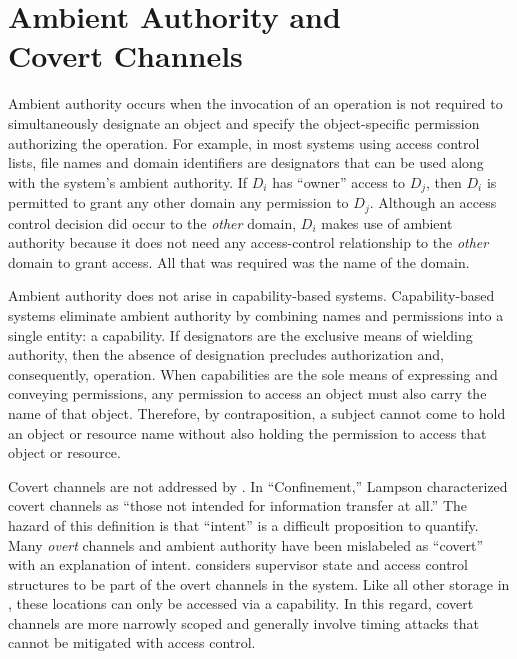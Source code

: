 \section[Ambient Authority and Covert Channels]{Ambient Authority and \\ Covert Channels}
\label{sect:constructor:ambientAuthority}

Ambient authority occurs when the invocation of an operation is not required to simultaneously designate an object and specify the object-specific permission authorizing the operation.
For example, in most systems using access control lists, file names and domain identifiers are designators that can be used along with the system's ambient authority.
If \(D_i\) has ``owner'' access to \(D_j\), then \(D_i\) is permitted to grant any other domain any permission to \(D_j\).
Although an access control decision did occur to the \emph{other} domain, \(D_i\) makes use of ambient authority because it does not need any access-control relationship to the \emph{other} domain to grant access.
All that was required was the name of the domain.

Ambient authority does not arise in capability-based systems.
Capability-based systems eliminate ambient authority by combining names and permissions into a single entity: a capability.
If designators are the exclusive means of wielding authority, then the absence of designation precludes authorization and, consequently, operation.
When capabilities are the sole means of expressing and conveying permissions, any permission to access an object must also carry the name of that object.
Therefore, by contraposition, a subject cannot come to hold an object or resource name without also holding the permission to access that object or resource.

Covert channels are not addressed by \TMmodelName{}.
In ``Confinement,'' Lampson characterized covert channels as ``those not intended for information transfer at all.'' \cite{Lampson:ConfinementNote}
The hazard of this definition is that ``intent'' is a difficult proposition to quantify.
Many \emph{overt} channels and ambient authority have been mislabeled as ``covert'' with an explanation of intent.
\TMmodelName{} considers supervisor state and access control structures to be part of the overt channels in the system.
Like all other storage in \TMmodelName{}, these locations can only be accessed via a capability.
In this regard, covert channels are more narrowly scoped and generally involve timing attacks that cannot be mitigated with access control.

